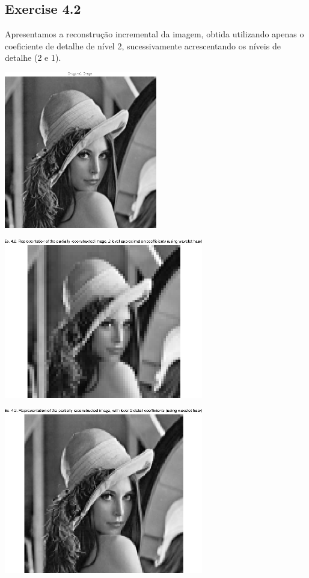 \documentclass[a4paper]{article}
\begin{document}
\subsection{Exercise 4.2}
\indent \indent Apresentamos a reconstrução incremental da imagem, obtida utilizando apenas o coeficiente de detalhe de nível 2, sucessivamente acrescentando os níveis de detalhe (2 e 1).
\begin{center}
	\includegraphics[width=0.50\textwidth]{images/ex_4_2_original.png}
\end{center}
\begin{center}
	\includegraphics[width=0.65\textwidth]{images/ex_4_2_a2.png}
\end{center}
\begin{center}
	\includegraphics[width=0.65\textwidth]{images/ex_4_2_d2.png}
\end{center}
\end{document}
